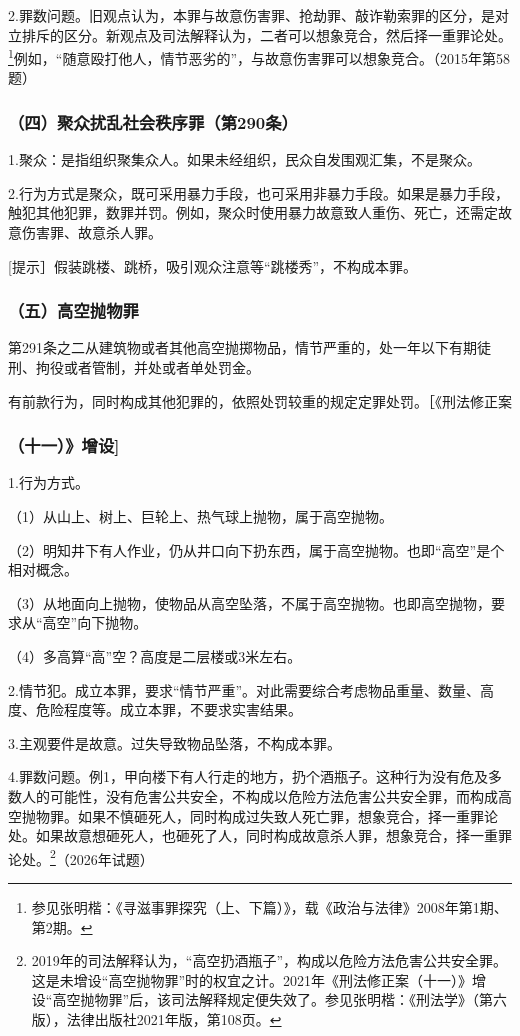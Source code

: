 2.罪数问题。旧观点认为，本罪与故意伤害罪、抢劫罪、敲诈勒索罪的区分，是对立排斥的区分。新观点及司法解释认为，二者可以想象竞合，然后择一重罪论处。\footnote{参见张明楷：《寻滋事罪探究（上、下篇）》，载《政治与法律》2008年第1期、第2期。}例如，“随意殴打他人，情节恶劣的”，与故意伤害罪可以想象竞合。（2015年第58题）

\subsubsection*{（四）聚众扰乱社会秩序罪（第290条）}

1.聚众：是指组织聚集众人。如果未经组织，民众自发围观汇集，不是聚众。

2.行为方式是聚众，既可采用暴力手段，也可采用非暴力手段。如果是暴力手段，触犯其他犯罪，数罪并罚。例如，聚众时使用暴力故意致人重伤、死亡，还需定故意伤害罪、故意杀人罪。

[提示］假装跳楼、跳桥，吸引观众注意等“跳楼秀”，不构成本罪。

\subsubsection*{（五）高空抛物罪}

第291条之二从建筑物或者其他高空抛掷物品，情节严重的，处一年以下有期徒刑、拘役或者管制，并处或者单处罚金。

有前款行为，同时构成其他犯罪的，依照处罚较重的规定定罪处罚。［《刑法修正案

\subsubsection*{（十一）》增设]}

1.行为方式。

（1）从山上、树上、巨轮上、热气球上抛物，属于高空抛物。

（2）明知井下有人作业，仍从井口向下扔东西，属于高空抛物。也即“高空”是个相对概念。

（3）从地面向上抛物，使物品从高空坠落，不属于高空抛物。也即高空抛物，要求从“高空”向下抛物。

（4）多高算“高”空？高度是二层楼或3米左右。

2.情节犯。成立本罪，要求“情节严重”。对此需要综合考虑物品重量、数量、高度、危险程度等。成立本罪，不要求实害结果。

3.主观要件是故意。过失导致物品坠落，不构成本罪。

4.罪数问题。例1，甲向楼下有人行走的地方，扔个酒瓶子。这种行为没有危及多数人的可能性，没有危害公共安全，不构成以危险方法危害公共安全罪，而构成高空抛物罪。如果不慎砸死人，同时构成过失致人死亡罪，想象竞合，择一重罪论处。如果故意想砸死人，也砸死了人，同时构成故意杀人罪，想象竞合，择一重罪论处。\footnote{2019年的司法解释认为，“高空扔酒瓶子”，构成以危险方法危害公共安全罪。这是未增设“高空抛物罪”时的权宜之计。2021年《刑法修正案（十一）》增设“高空抛物罪”后，该司法解释规定便失效了。参见张明楷：《刑法学》（第六版），法律出版社2021年版，第108页。}（2026年试题）

